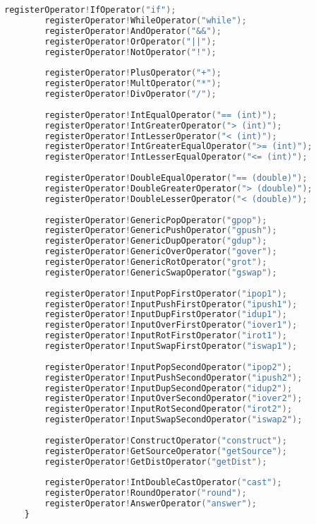 \documentclass[russian,utf8,emptystyle]{eskdtext}
\begin{document}
\begin{lstlisting}[language=D]
        registerOperator!IfOperator("if");
        registerOperator!WhileOperator("while");
        registerOperator!AndOperator("&&");
        registerOperator!OrOperator("||");
        registerOperator!NotOperator("!");
        
        registerOperator!PlusOperator("+");
        registerOperator!MultOperator("*");
        registerOperator!DivOperator("/");
        
        registerOperator!IntEqualOperator("== (int)");
        registerOperator!IntGreaterOperator("> (int)");
        registerOperator!IntLesserOperator("< (int)");
        registerOperator!IntGreaterEqualOperator(">= (int)");
        registerOperator!IntLesserEqualOperator("<= (int)");
        
        registerOperator!DoubleEqualOperator("== (double)");
        registerOperator!DoubleGreaterOperator("> (double)");
        registerOperator!DoubleLesserOperator("< (double)");
        
        registerOperator!GenericPopOperator("gpop");
        registerOperator!GenericPushOperator("gpush");
        registerOperator!GenericDupOperator("gdup");
        registerOperator!GenericOverOperator("gover");
        registerOperator!GenericRotOperator("grot");
        registerOperator!GenericSwapOperator("gswap");
        
        registerOperator!InputPopFirstOperator("ipop1");
        registerOperator!InputPushFirstOperator("ipush1");
        registerOperator!InputDupFirstOperator("idup1");
        registerOperator!InputOverFirstOperator("iover1");
        registerOperator!InputRotFirstOperator("irot1");
        registerOperator!InputSwapFirstOperator("iswap1");
        
        registerOperator!InputPopSecondOperator("ipop2");
        registerOperator!InputPushSecondOperator("ipush2");
        registerOperator!InputDupSecondOperator("idup2");
        registerOperator!InputOverSecondOperator("iover2");
        registerOperator!InputRotSecondOperator("irot2");
        registerOperator!InputSwapSecondOperator("iswap2");
        
        registerOperator!ConstructOperator("construct");
        registerOperator!GetSourceOperator("getSource");
        registerOperator!GetDistOperator("getDist");
        
        registerOperator!IntDoubleCastOperator("cast");
        registerOperator!RoundOperator("round");
        registerOperator!AnswerOperator("answer");
    }
    

\end{lstlisting}
\end{document}
